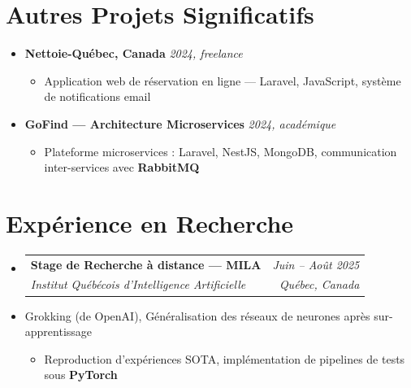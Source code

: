 \documentclass[a4paper,11pt]{article}
\makeatletter
\newcommand{\resumeItem}[1]{\item\small{#1}}
\newcommand{\resumeSubheading}[4]{
  \vspace{-1pt}\item
    \begin{tabular*}{0.97\textwidth}[t]{l@{\extracolsep{\fill}}r}
      \textbf{#1} & \textit{\small #2} \\
      \textit{\small #3} & \textit{\small #4} \\
    \end{tabular*}\vspace{-5pt}
}
\makeatother
\begin{document}
\section{Autres Projets Significatifs}
\begin{itemize}[leftmargin=*, label={}]

    \item \textbf{Nettoie-Québec, Canada} \hfill \textit{2024, freelance}
    \vspace{-2pt}
    \begin{itemize}[leftmargin=0.4cm, nosep, label=\tiny$\bullet$]
        \item \small{Application web de réservation en ligne — Laravel, JavaScript, système de notifications email}
    \end{itemize}
    \vspace{2pt}


    \item \textbf{GoFind — Architecture Microservices} \hfill \textit{2024, académique}
    \vspace{-2pt}
    \begin{itemize}[leftmargin=0.4cm, nosep, label=\tiny$\bullet$]
        \item \small{Plateforme microservices : Laravel, NestJS, MongoDB, communication inter-services avec \textbf{RabbitMQ}}
    \end{itemize}

\end{itemize}

\section{Expérience en Recherche}
\begin{itemize}[leftmargin=*, label={}]
    \resumeSubheading
      {Stage de Recherche à distance — MILA}{Juin -- Août 2025}
      {Institut Québécois d'Intelligence Artificielle}{Québec, Canada}
      \resumeItem{Grokking (de OpenAI), Généralisation des réseaux de neurones après sur-apprentissage}
      \begin{itemize}[leftmargin=0.4cm, nosep, label=\tiny$\bullet$]
        \item \small{Reproduction d'expériences SOTA, implémentation de pipelines de tests sous \textbf{PyTorch}}
      \end{itemize}
\end{itemize}
\end{document}
